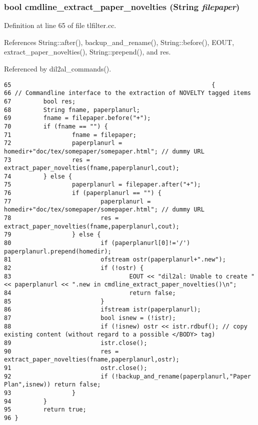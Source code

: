 \subsubsection{\setlength{\rightskip}{0pt plus 5cm}bool cmdline\_\-extract\_\-paper\_\-novelties ({\bf String} {\em filepaper})}\label{dil2al_8hh_a346}




Definition at line 65 of file tlfilter.cc.

References String::after(), backup\_\-and\_\-rename(), String::before(), EOUT, extract\_\-paper\_\-novelties(), String::prepend(), and res.

Referenced by dil2al\_\-commands().



\footnotesize\begin{verbatim}65                                                        {
66 // Commandline interface to the extraction of NOVELTY tagged items
67         bool res;
68         String fname, paperplanurl;
69         fname = filepaper.before("+");
70         if (fname == "") {
71                 fname = filepaper;
72                 paperplanurl = homedir+"doc/tex/somepaper/somepaper.html"; // dummy URL
73                 res = extract_paper_novelties(fname,paperplanurl,cout);
74         } else {
75                 paperplanurl = filepaper.after("+");
76                 if (paperplanurl == "") {
77                         paperplanurl = homedir+"doc/tex/somepaper/somepaper.html"; // dummy URL
78                         res = extract_paper_novelties(fname,paperplanurl,cout);
79                 } else {
80                         if (paperplanurl[0]!='/') paperplanurl.prepend(homedir);
81                         ofstream ostr(paperplanurl+".new");
82                         if (!ostr) {
83                                 EOUT << "dil2al: Unable to create " << paperplanurl << ".new in cmdline_extract_paper_novelties()\n";
84                                 return false;
85                         }
86                         ifstream istr(paperplanurl);
87                         bool isnew = (!istr);
88                         if (!isnew) ostr << istr.rdbuf(); // copy existing content (without regard to a possible </BODY> tag)
89                         istr.close();
90                         res = extract_paper_novelties(fname,paperplanurl,ostr);
91                         ostr.close();
92                         if (!backup_and_rename(paperplanurl,"Paper Plan",isnew)) return false;
93                 }
94         }
95         return true;
96 }
\end{verbatim}\normalsize 
{}

